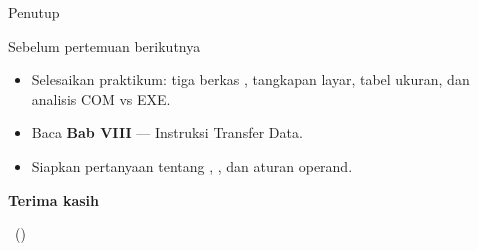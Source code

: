 \documentclass[aspectratio=169,11pt]{beamer}
\begin{document}
\begin{frame}{Penutup}
\begin{block}{Sebelum pertemuan berikutnya}
\small
\begin{itemize}
    \item Selesaikan praktikum: tiga berkas , tangkapan
          layar, tabel ukuran, dan analisis COM vs EXE.
    \item Baca \textbf{Bab VIII} — Instruksi Transfer Data.
    \item Siapkan pertanyaan tentang , , dan
          aturan operand.
\end{itemize}
\end{block}

\vspace{0.4em}
\begin{center}
{\color{obeBlue}\sffamily\large\bfseries Terima kasih\par}
\vspace{0.15em}
{\color{obeGray}\sffamily\small \NamaMK\ (\KodeMK)
\textbullet\ \SemesterTeks\par}
\end{center}
\end{frame}
\end{document}
